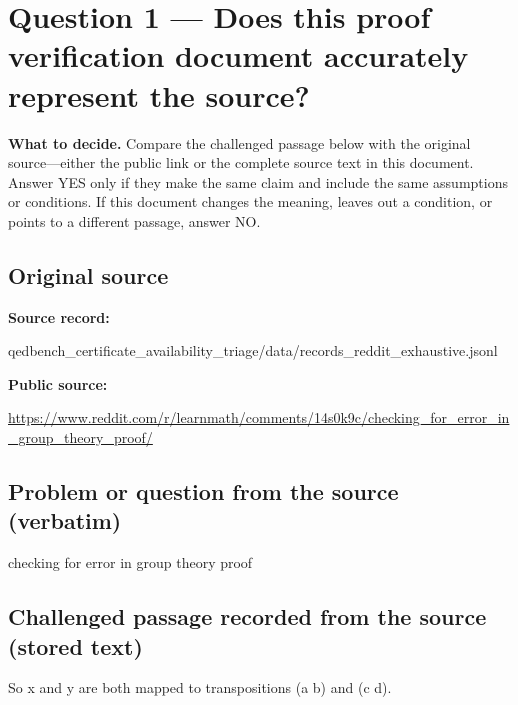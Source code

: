 \documentclass[11pt]{article}
\begin{document}
\section*{Question 1 --- Does this proof verification document accurately represent the source?}
\textbf{What to decide.} Compare the challenged passage below with the original source---either the public link or the complete source text in this document. Answer YES only if they make the same claim and include the same assumptions or conditions. If this document changes the meaning, leaves out a condition, or points to a different passage, answer NO.
\subsection*{Original source}
\textbf{Source record:}
\begin{Vsrc}
qedbench_certificate_availability_triage/data/records_reddit_exhaustive.jsonl
\end{Vsrc}
\textbf{Public source:}\par
\url{https://www.reddit.com/r/learnmath/comments/14s0k9c/checking_for_error_in_group_theory_proof/}\par
\subsection*{Problem or question from the source (verbatim)}
\begin{Vsrc}
checking for error in group theory proof
\end{Vsrc}
\subsection*{Challenged passage recorded from the source (stored text)}
\begin{Vsrc}
So x and y are both mapped to transpositions (a b) and (c d).
\end{Vsrc}
\end{document}
